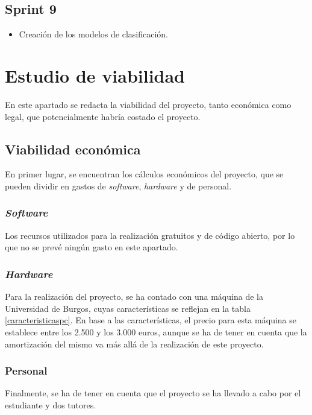 \subsection{Sprint 9}

\begin{itemize}
\item Creación de los modelos de clasificación.
\end{itemize}

\section{Estudio de viabilidad}

En este apartado se redacta la viabilidad del proyecto, tanto económica como legal, que potencialmente habría costado el proyecto.

\subsection{Viabilidad económica}

En primer lugar, se encuentran los cálculos económicos del proyecto, que se pueden dividir en gastos de \textit{software}, \textit{hardware} y de personal.

\subsubsection{\textit{Software}}

Los recursos utilizados para la realización gratuitos y de código abierto, por lo que no se prevé ningún gasto en este apartado.

\subsubsection{\textit{Hardware}}

Para la realización del proyecto, se ha contado con una máquina de la Universidad de Burgos, cuyas características se reflejan en la tabla \ref{caracteristicaspc}.
En base a las características, el precio para esta máquina se establece entre los 2.500 y los 3.000 euros, aunque se ha de tener en cuenta que la amortización del mismo va más allá de la realización de este proyecto.

\subsubsection{Personal}

Finalmente, se ha de tener en cuenta que el proyecto se ha llevado a cabo por el estudiante y dos tutores.

